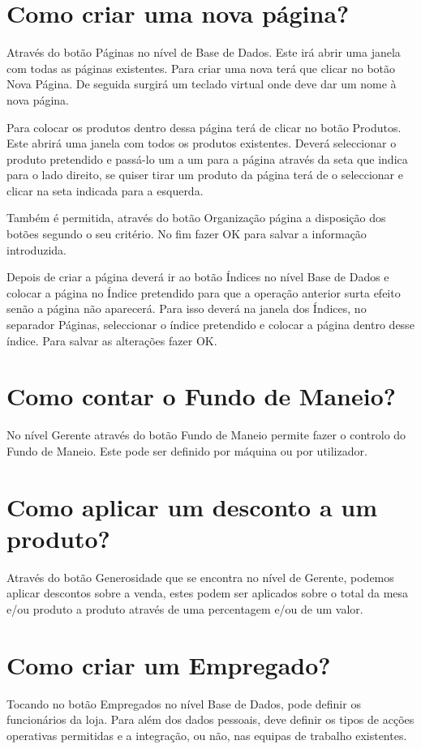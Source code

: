 \documentclass[a4paper,11pt,openany]{memoir}
\begin{document}
\section{Como criar uma nova página?}
Através do botão Páginas no nível de Base de Dados. 
Este irá abrir uma janela com
todas as páginas existentes. Para criar uma nova terá que clicar no botão Nova
Página. De seguida surgirá um teclado virtual onde deve dar um nome à nova
página. 

Para colocar os produtos dentro dessa página terá de clicar no botão
Produtos. Este abrirá uma janela com todos os produtos existentes. Deverá
seleccionar o produto pretendido e passá-lo um a um para a página através da seta
que indica para o lado direito, se quiser tirar um produto da página terá de o
seleccionar e clicar na seta indicada para a esquerda. 

Também é permitida, através
do botão Organização página a disposição dos botões segundo o seu critério. No fim
fazer OK para salvar a informação introduzida. 

Depois de criar a página deverá ir ao
botão Índices no nível Base de Dados e colocar a página no Índice pretendido para
que a operação anterior surta efeito senão a página não aparecerá. Para isso deverá
na janela dos Índices, no separador Páginas, seleccionar o índice pretendido e
colocar a página dentro desse índice. Para salvar as alterações fazer OK.

\section{Como contar o Fundo de Maneio?}
No nível Gerente através do botão Fundo de Maneio permite fazer o controlo do
Fundo de Maneio. Este pode ser definido por máquina ou por utilizador.

\section{Como aplicar um desconto a um produto?}
Através do botão Generosidade que se encontra no nível de Gerente, podemos
aplicar descontos sobre a venda, estes podem ser aplicados sobre o total da mesa
e/ou produto a produto através de uma percentagem e/ou de um valor.

\section{Como criar um Empregado?}
Tocando no botão Empregados no nível Base de Dados, pode definir os funcionários
da loja. Para além dos dados pessoais, deve definir os tipos de acções operativas
permitidas e a integração, ou não, nas equipas de trabalho existentes.
\end{document}
